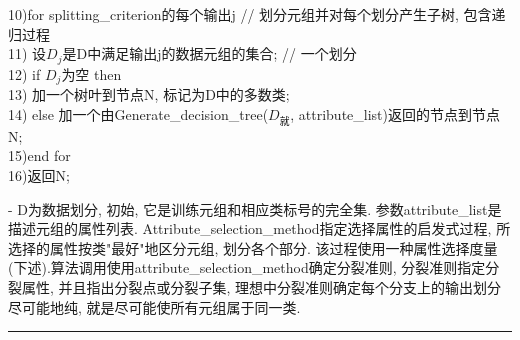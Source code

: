 \documentclass[a4paper,10pt,english]{article}
\begin{document}
10)\hspace{3em}for splitting\_criterion的每个输出j // 划分元组并对每个划分产生子树, 包含递归过程 \\
11)\hspace{6em}    设$D_j$是D中满足输出j的数据元组的集合; // 一个划分 \\
12)\hspace{6em}    if $D_j$为空 then\\
13)\hspace{9em}        加一个树叶到节点N, 标记为D中的多数类;\\
14)\hspace{6em}    else 加一个由Generate\_decision\_tree($D_就$, attribute\_list)返回的节点到节点N; \\
15)\hspace{3em}end for \\
16)\hspace{3em}返回N;

\begin{description}
\item {-}
\small{
D为数据划分, 初始, 它是训练元组和相应类标号的完全集. 参数attribute\_list是描述元组的属性列表. Attribute\_selection\_method指定选择属性的启发式过程, 所选择的属性按类"最好"地区分元组, 划分各个部分. 该过程使用一种属性选择度量(下述).算法调用使用attribute\_selection\_method确定分裂准则, 分裂准则指定分裂属性, 并且指出分裂点或分裂子集, 理想中分裂准则确定每个分支上的输出划分尽可能地纯, 就是尽可能使所有元组属于同一类.}
\end{description}
\rule{16cm}{1pt} \\
\end{document}
